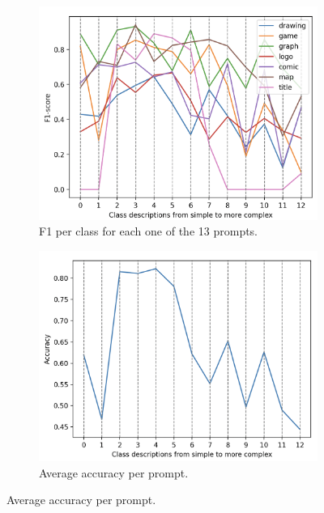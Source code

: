 \begin{figure}[ht]
    \centering
    \begin{subfigure}{0.47\textwidth}
        \includegraphics[width=\linewidth]{Images/CLIP-results/CLIP-holostic-res.png}
        \caption{F1 per class for each one of the 13 prompts.}
        \label{ig:CLIP-zero-shot-13-A}
    \end{subfigure}%
    \hspace{0.06\textwidth}%
    \begin{subfigure}{0.47\textwidth}
        \includegraphics[width=\linewidth]{Images/CLIP-results/CLIP-holistic-avg-acc.png}
        \caption{Average accuracy per prompt.}
        \label{ig:CLIP-zero-shot-13-B}
    \end{subfigure}
    

\end{figure}
